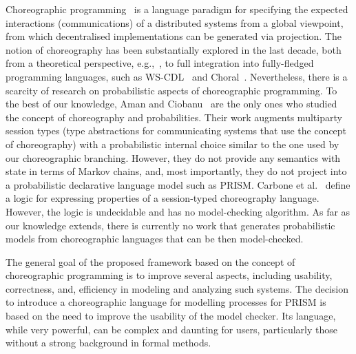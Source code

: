 %
  Choreographic programming~\cite{M23} is a
language paradigm for specifying the expected interactions
(communications) of a distributed systems from a global viewpoint,
from which decentralised implementations can be generated via
projection. The notion of choreography has been substantially explored
in the last decade, both from a theoretical perspective,
e.g.,~\cite{CHY12,CM13}, to full integration into fully-fledged
programming languages, such as WS-CDL~\cite{HYC07b} and
Choral~\cite{GMP24}. Nevertheless, there is a scarcity of research on
probabilistic aspects of choreographic programming.
%
To the best of our knowledge, Aman and Ciobanu~\cite{AC19,AC22} are
the only ones who studied the concept of choreography and
probabilities. Their work augments multiparty session types (type
abstractions for communicating systems that use the concept of
choreography) with a probabilistic internal choice similar to the one
used by our choreographic branching. However, they do not provide any
semantics with state in terms of Markov chains, and, most importantly,
they do not project into a probabilistic declarative language model
such as PRISM.
%
Carbone et al.~\cite{CGHL10} define a logic for expressing properties
of a session-typed choreography language. However, the logic is
undecidable and has no model-checking algorithm. %
%
As far as our knowledge extends, there is currently no work that
generates probabilistic models from choreographic languages that can
be then model-checked.



%
The general goal of the proposed framework based on the concept of
choreographic programming is to improve several aspects, including
usability, correctness, and, efficiency in modeling and analyzing such
systems.
%
The decision to introduce a choreographic language for modelling
processes for PRISM is based on the need to improve the usability of
the model checker. Its language, while very powerful, can be complex
and daunting for users, particularly those without a strong background
in formal methods.

